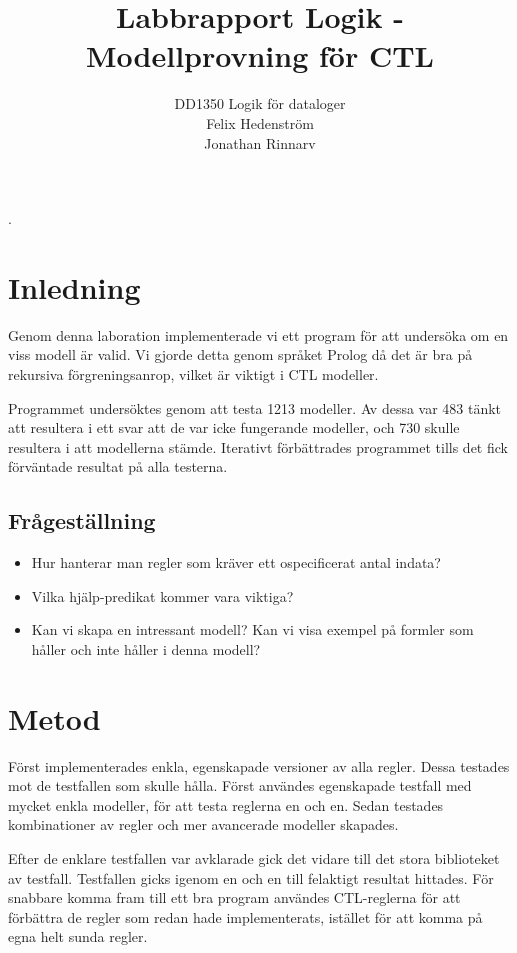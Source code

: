 \documentclass[a4paper]{article}
\begin{document}
\title{Labbrapport Logik - Modellprovning för CTL}
\author{DD1350 Logik för dataloger \\ Felix Hedenström\\ Jonathan Rinnarv}
\maketitle
\thispagestyle{empty}
\newpage
\tableofcontents
\thispagestyle{empty}
\newpage
\setcounter{page}{1}.
\section{Inledning}
Genom denna laboration implementerade vi ett program för att undersöka om en viss modell är valid. Vi gjorde detta genom språket Prolog då det är bra på rekursiva förgreningsanrop, vilket är viktigt i CTL modeller.  

Programmet undersöktes genom att testa 1213 modeller. Av dessa var 483 tänkt att resultera i ett svar att de var icke fungerande modeller, och 730 skulle resultera i att modellerna stämde. Iterativt förbättrades programmet tills det fick förväntade resultat på alla testerna.

\subsection{Frågeställning}
\begin{itemize}
\item Hur hanterar man regler som kräver ett ospecificerat antal indata?
\item Vilka hjälp-predikat kommer vara viktiga?
\item Kan vi skapa en intressant modell? Kan vi visa exempel på formler som håller och inte håller i denna modell?
\end{itemize}
\section{Metod}
Först implementerades enkla, egenskapade versioner av alla regler. Dessa testades mot de testfallen som skulle hålla. Först användes egenskapade testfall med mycket enkla modeller, för att testa reglerna en och en. Sedan testades kombinationer av regler och mer avancerade modeller skapades.

Efter de enklare testfallen var avklarade gick det vidare till det stora biblioteket av testfall. Testfallen gicks igenom en och en till felaktigt resultat hittades. För snabbare komma fram till ett bra program användes CTL-reglerna för att förbättra de regler som redan hade implementerats, istället för att komma på egna helt sunda regler. 
\end{document}
